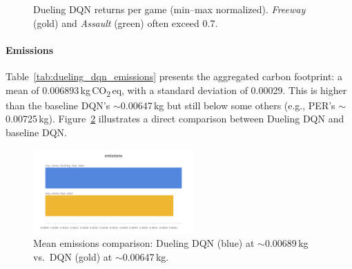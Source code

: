 \begin{figure}
	\centering
	
	\caption{Dueling DQN returns per game (min--max normalized). 
		\emph{Freeway} (gold) and \emph{Assault} (green) often exceed 0.7.}
	\label{fig:dueling_return_pergame_minmax}
\end{figure}

\paragraph{Emissions}
Table~\ref{tab:dueling_dqn_emissions} presents the aggregated carbon footprint: 
a mean of \num{0.006893}\,kg\,CO\textsubscript{2}\,eq, with a standard deviation of \num{0.00029}. 
This is higher than the baseline DQN's $\sim$\num{0.00647}\,kg 
but still below some others (e.g., PER's $\sim$\num{0.00725}\,kg). 
Figure~\ref{fig:dueling_emissions_barplot} illustrates a direct comparison 
between Dueling DQN and baseline DQN.

\begin{table}
	\caption{Carbon emissions (kg\,CO\textsubscript{2}\,eq) for Dueling DQN across 32 runs.}
	\label{tab:dueling_dqn_emissions}
	\centering
\end{table}

\begin{figure}
	\centering
	\includegraphics[width=0.55\textwidth]{figures/dueling_dqn/png/emissions_dqn_dueling.png}
	\caption{Mean emissions comparison: Dueling DQN (blue) at $\sim$\num{0.00689}\,kg vs.\ DQN (gold) at $\sim$\num{0.00647}\,kg.}
	\label{fig:dueling_emissions_barplot}
\end{figure}

